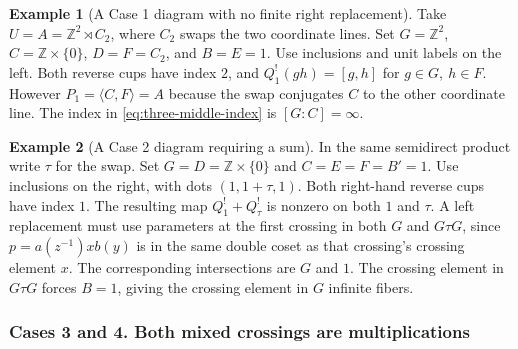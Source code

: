 \documentclass[11pt,a4paper]{article}
\numberwithin{equation}{section}
\theoremstyle{definition}
\newtheorem{example}{Example}[section]
\newcommand{\mixedThreeWires}[3]{%
  \draw[#1] (0,0)--(0,.26)
    .. controls (0,.73) and (1.4,.91) .. (1.4,1.45)
    --(1.4,1.79)
    .. controls (1.4,2.33) and (2.8,2.47) .. (2.8,3.01)
    --(2.8,4.8);
  \draw[#2] (1.4,0)--(1.4,.26)
    .. controls (1.4,.73) and (0,.91) .. (0,1.45)
    --(0,3.35)
    .. controls (0,3.89) and (1.4,4.03) .. (1.4,4.57)
    --(1.4,4.8);
  \draw[#3] (2.8,0)--(2.8,1.79)
    .. controls (2.8,2.33) and (1.4,2.47) .. (1.4,3.01)
    --(1.4,3.35)
    .. controls (1.4,3.89) and (0,4.03) .. (0,4.57)
    --(0,4.8);
}
\newcommand{\mixedThreeLeft}{%
  \foreach \x/\y/\i/\offset in {.7/.82875/1/-.43,2.1/2.4/2/.43,.7/3.96/3/-.43}{
    \fill (\x,\y) circle (1.9pt);
    \node[strandlabel] at ({\x+\offset},\y) {$x_{\i}$};
  }
  \node[region] at (.69,2.4) {$B$};
}
\newcommand{\mixedThreeRight}{%
  \foreach \x/\y/\i/\offset in {2.1/.82875/1/.43,.7/2.4/2/-.43,2.1/3.96/3/.43}{
    \fill (\x,\y) circle (1.9pt);
    \node[strandlabel] at ({\x+\offset},\y) {$y_{\i}$};
  }
  \node[region] at (2.11,2.4) {$B'$};
}
\newcommand{\mixedThreeBoundary}[7]{%
  \node[region] at (-.48,2.4) {$G$};
  \node[region] at (3.28,2.4) {$F$};
  \node[region] at (.70,.18) {$#1$};
  \node[region] at (2.10,.18) {$#2$};
  \node[region] at (.70,4.60) {$#3$};
  \node[region] at (2.10,4.60) {$#4$};
  \foreach \x/\lab in {#5} {\node[strandlabel] at (\x,-.35) {$\bar\lab$};}
  \foreach \x/\lab in {#6} {\node[strandlabel] at (\x,5.15) {$\bar\lab$};}
  \node[font=\normalsize] at (1.4,-.90) {Case #7};
}
\begin{document}
\begin{example}[A Case 1 diagram with no finite right replacement]\label{ex:case-one-no-finite-replacement}
Take \(U=A=\mathbb Z^2\rtimes C_2\), where \(C_2\) swaps the two
coordinate lines. Set \(G=\mathbb Z^2\), \(C=\mathbb Z\times\{0\}\),
\(D=F=C_2\), and \(B=E=1\). Use inclusions and unit labels on the left. Both
reverse cups have index \(2\), and \(Q_1^!(gh)=[g,h]\) for \(g\in G,\ h\in F\).
However \(P_1=\langle C,F\rangle=A\) because the swap conjugates \(C\) to the
other coordinate line. The index in \eqref{eq:three-middle-index} is
\([G:C]=\infty\).
\end{example}


\begin{example}[A Case 2 diagram requiring a sum]\label{ex:case-two-needs-a-sum}
In the same semidirect product write \(\tau\) for the swap.
Set \(G=D=\mathbb Z\times\{0\}\) and \(C=E=F=B'=1\). Use inclusions on
the right, with dots \((1,1+\tau,1)\). Both right-hand reverse cups
have index \(1\). The resulting map \(Q_1^!+Q_\tau^!\) is nonzero on
both \(1\) and \(\tau\). A left replacement must use parameters at the
first crossing in both \(G\) and \(G\tau G\), since \(p=a(z^{-1})x b(y)\) is
in the same double coset as that crossing's crossing element \(x\). The
corresponding intersections are \(G\) and \(1\). The crossing element in
\(G\tau G\) forces \(B=1\), giving the crossing element in \(G\) infinite fibers.
\end{example}

\subsubsection{Cases 3 and 4. Both mixed crossings are multiplications}

\begin{center}
\end{center}
\end{document}
